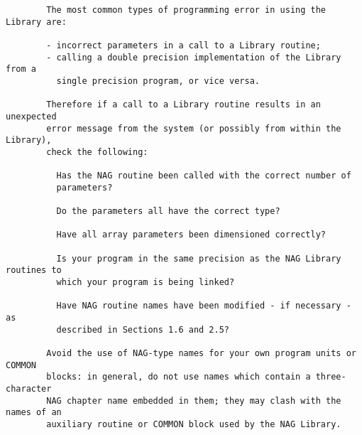 \begin{small}
\begin{verbatim}
        The most common types of programming error in using the Library are:      
                                                                                  
        - incorrect parameters in a call to a Library routine;                    
        - calling a double precision implementation of the Library from a         
          single precision program, or vice versa.                                
                                                                                  
        Therefore if a call to a Library routine results in an unexpected         
        error message from the system (or possibly from within the Library),      
        check the following:                                                      
                                                                                  
          Has the NAG routine been called with the correct number of              
          parameters?                                                             
                                                                                  
          Do the parameters all have the correct type?                            
                                                                                  
          Have all array parameters been dimensioned correctly?                   
                                                                                  
          Is your program in the same precision as the NAG Library routines to    
          which your program is being linked?                                     
                                                                                  
          Have NAG routine names have been modified - if necessary - as           
          described in Sections 1.6 and 2.5?                                      
                                                                                  
        Avoid the use of NAG-type names for your own program units or COMMON      
        blocks: in general, do not use names which contain a three-character      
        NAG chapter name embedded in them; they may clash with the names of an    
        auxiliary routine or COMMON block used by the NAG Library.                
                                                                                  

\end{verbatim}
\end{small}
